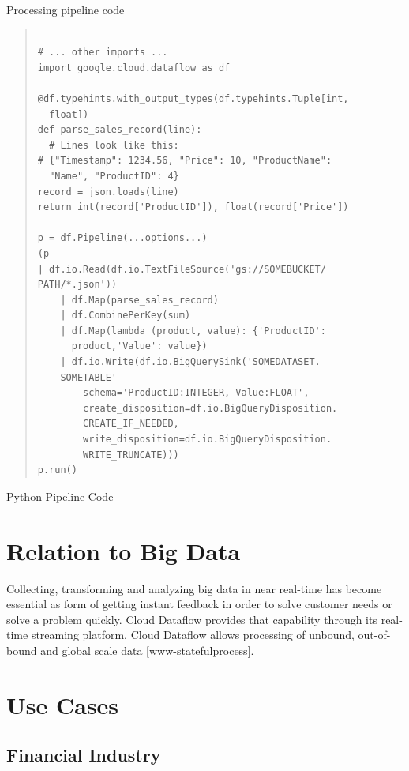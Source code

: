 \documentclass[9pt,twocolumn,twoside]{styles/osajnl}
\begin{document}
\begin{algorithm}
\caption{Processing pipeline code}\label{alg:python}
\begin{quote}
\begin{Verbatim}
    
# ... other imports ...
import google.cloud.dataflow as df

@df.typehints.with_output_types(df.typehints.Tuple[int,
  float])
def parse_sales_record(line):
  # Lines look like this:
# {"Timestamp": 1234.56, "Price": 10, "ProductName":
  "Name", "ProductID": 4}
record = json.loads(line)
return int(record['ProductID']), float(record['Price'])

p = df.Pipeline(...options...)
(p
| df.io.Read(df.io.TextFileSource('gs://SOMEBUCKET/
PATH/*.json'))
    | df.Map(parse_sales_record)
    | df.CombinePerKey(sum)
    | df.Map(lambda (product, value): {'ProductID':
      product,'Value': value})
    | df.io.Write(df.io.BigQuerySink('SOMEDATASET.
    SOMETABLE'
        schema='ProductID:INTEGER, Value:FLOAT',
        create_disposition=df.io.BigQueryDisposition.
        CREATE_IF_NEEDED,
        write_disposition=df.io.BigQueryDisposition.
        WRITE_TRUNCATE)))
p.run()

\end{Verbatim}
\end{quote}
Python Pipeline Code \cite{www-pythoncode}
\end{algorithm}


\section{Relation to Big Data}

Collecting, transforming and analyzing big data in near real-time has
become essential as form of getting instant feedback in order to solve
customer needs or solve a problem quickly. Cloud Dataflow provides
that capability through its real-time streaming platform. Cloud
Dataflow allows processing of unbound, out-of-bound and global scale
data [www-statefulprocess].

\section{Use Cases}

\subsection{Financial Industry}
\end{document}
